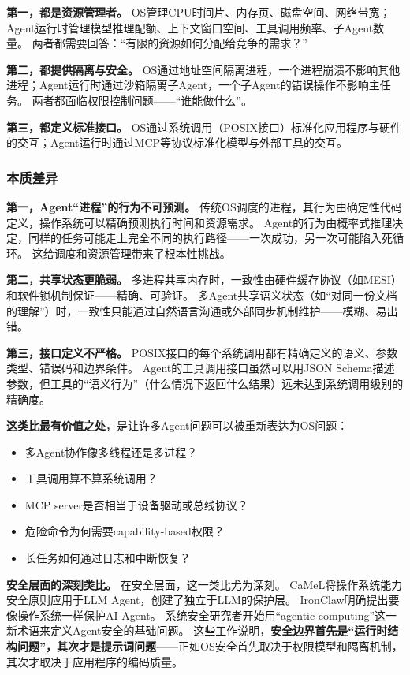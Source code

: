 \textbf{第一，都是资源管理者。}
OS管理CPU时间片、内存页、磁盘空间、网络带宽；Agent运行时管理模型推理配额、上下文窗口空间、工具调用频率、子Agent数量。
两者都需要回答：``有限的资源如何分配给竞争的需求？''

\textbf{第二，都提供隔离与安全。}
OS通过地址空间隔离进程，一个进程崩溃不影响其他进程\cite{ostep_2023}；Agent运行时通过沙箱隔离子Agent，一个子Agent的错误操作不影响主任务\cite{openai_codex_sandbox_2026,anthropic_claudecode_sandbox_2026}。
两者都面临权限控制问题——``谁能做什么''。

\textbf{第三，都定义标准接口。}
OS通过系统调用（POSIX接口）标准化应用程序与硬件的交互；Agent运行时通过MCP等协议标准化模型与外部工具的交互\cite{mcp_intro_2026}。

\subsubsection{本质差异}

\textbf{第一，Agent``进程''的行为不可预测。}
传统OS调度的进程，其行为由确定性代码定义，操作系统可以精确预测执行时间和资源需求。
Agent的行为由概率式推理决定，同样的任务可能走上完全不同的执行路径——一次成功，另一次可能陷入死循环。
这给调度和资源管理带来了根本性挑战。

\textbf{第二，共享状态更脆弱。}
多进程共享内存时，一致性由硬件缓存协议（如MESI）和软件锁机制保证——精确、可验证。
多Agent共享语义状态（如``对同一份文档的理解''）时，一致性只能通过自然语言沟通或外部同步机制维护——模糊、易出错。

\textbf{第三，接口定义不严格。}
POSIX接口的每个系统调用都有精确定义的语义、参数类型、错误码和边界条件。
Agent的工具调用接口虽然可以用JSON Schema描述参数，但工具的``语义行为''（什么情况下返回什么结果）远未达到系统调用级别的精确度。

\textbf{这类比最有价值之处}，是让许多Agent问题可以被重新表达为OS问题：
\begin{itemize}[nosep]
\item 多Agent协作像多线程还是多进程？\cite{wu2023autogen}
\item 工具调用算不算系统调用？
\item MCP server是否相当于设备驱动或总线协议？\cite{mcp_intro_2026}
\item 危险命令为何需要capability-based权限？\cite{debenedetti2025camel}
\item 长任务如何通过日志和中断恢复？\cite{openai_codex_approvals_2026}
\end{itemize}

\textbf{安全层面的深刻类比。}
在安全层面，这一类比尤为深刻。
CaMeL将操作系统能力安全原则应用于LLM Agent，创建了独立于LLM的保护层\cite{debenedetti2025camel}。
IronClaw明确提出要像操作系统一样保护AI Agent\cite{ironclaw2025}。
系统安全研究者开始用``agentic computing''这一新术语来定义Agent安全的基础问题\cite{agenticsecurity2025}。
这些工作说明，\textbf{安全边界首先是``运行时结构问题''，其次才是提示词问题}——正如OS安全首先取决于权限模型和隔离机制，其次才取决于应用程序的编码质量。

